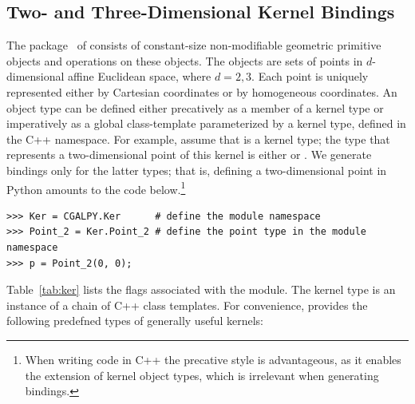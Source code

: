\subsection{Two- and Three-Dimensional Kernel Bindings}
\label{ssec:modules:kernel}
The \iiDandiiiDGeometryKernelPackage{}
package~\cite{cgal:bfghhkps-lgk23-21a} of \cgal{} consists of
constant-size non-modifiable geometric primitive objects and
operations on these objects. The objects are sets of points in
$d$-dimensional affine Euclidean space, where $d = 2,3$.  Each point
is uniquely represented either by Cartesian coordinates or by
homogeneous coordinates. An object type can be defined either
precatively as a member of a kernel type or imperatively as a global
class-template parameterized by a kernel type, defined in the C++
 namespace. For example, assume that
 is a kernel type; the type that represents a
two-dimensional point of this kernel is either
 or
.  We generate bindings only for
the latter types; that is, defining a two-dimensional point in Python
amounts to the code below.\footnote{When writing code in C++ the
  precative style is advantageous, as it enables the extension of
  kernel object types, which is irrelevant when generating bindings.}
\begin{lstlisting}[style=pythonStyle]
>>> Ker = CGALPY.Ker      # define the module namespace
>>> Point_2 = Ker.Point_2 # define the point type in the module namespace
>>> p = Point_2(0, 0);
\end{lstlisting}
Table~\ref{tab:ker} lists the \cmake{} flags associated with the
\iiDandiiiDGeometryKernelPackage{} module.  The kernel type is an
instance of a chain of C++ class templates. For convenience, \cgal{}
provides the following predefned types of generally useful kernels:
